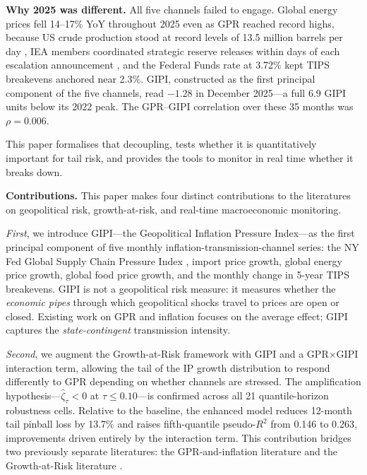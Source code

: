 \documentclass[12pt]{article}
\begin{document}
\textbf{Why 2025 was different.}
All five channels failed to engage.
Global energy prices fell 14--17\% YoY throughout 2025 even as
GPR reached record highs, because US crude production stood at
record levels of 13.5 million barrels per day \citep{baumeister2019},
IEA members coordinated strategic reserve releases within days of
each escalation announcement \citep{aiyar2023}, and
the Federal Funds rate at 3.72\% kept TIPS breakevens anchored
near 2.3\%.
GIPI, constructed as the first principal component of the five
channels, read $-1.28$ in December 2025---a full 6.9 GIPI units
below its 2022 peak.
The GPR--GIPI correlation over these 35 months was $\rho = 0.006$.

This paper formalises that decoupling, tests whether it is quantitatively
important for tail risk, and provides the tools to monitor in real time
whether it breaks down.

\medskip
\noindent\textbf{Contributions.}
This paper makes four distinct contributions to the literatures on
geopolitical risk, growth-at-risk, and real-time macroeconomic monitoring.

\textit{First}, we introduce GIPI---the Geopolitical Inflation Pressure
Index---as the first principal component of five monthly
inflation-transmission-channel series: the NY Fed Global Supply Chain
Pressure Index \citep{benigno2022}, import price growth, global energy
price growth, global food price growth, and the monthly change in
5-year TIPS breakevens.
GIPI is not a geopolitical risk measure: it measures whether the
\textit{economic pipes} through which geopolitical shocks travel to
prices are open or closed.
Existing work on GPR and inflation \citep{caldara2025,pinchetti2024}
focuses on the average effect; GIPI captures the \textit{state-contingent}
transmission intensity.

\textit{Second}, we augment the \citet{adrian2019} Growth-at-Risk
framework with GIPI and a GPR$\times$GIPI interaction term, allowing
the tail of the IP growth distribution to respond differently to GPR
depending on whether channels are stressed.
The amplification hypothesis---$\hat\zeta_\tau < 0$ at $\tau \leq 0.10$---is
confirmed across all 21 quantile-horizon robustness cells.
Relative to the baseline, the enhanced model reduces 12-month tail
pinball loss by 13.7\% and raises fifth-quantile pseudo-$R^2$ from
0.146 to 0.263, improvements driven entirely by the interaction term.
This contribution bridges two previously separate literatures:
the GPR-and-inflation literature
\citep{caldara2022,caldara2025,pinchetti2024,federle2024}
and the Growth-at-Risk literature
\citep{adrian2019,adams2021,lopezloria2024,chavleishvili2024}.
\end{document}
